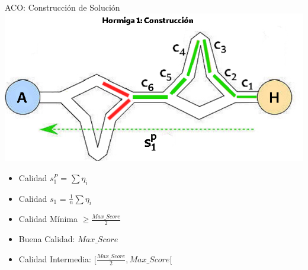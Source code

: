 \begin{frame}{ACO: Construcci\'on de Soluci\'on}
\centering
\includegraphics[scale=0.35]{Pictures/ACO-ant-Constr-choices.png}
\begin{itemize}
    \item Calidad $s^{P}_1$ = $\sum \eta_{i}$
    \item Calidad $s_1$ = $\frac{1}{n}\sum \eta_{i} $
    \item Calidad M\'inima $\geq \frac{Max\_Score}{2}$
    \item Buena Calidad: $Max\_Score$
    \item Calidad Intermedia: $[\frac{Max\_Score}{2}, Max\_Score[$
\end{itemize}
\end{frame}

